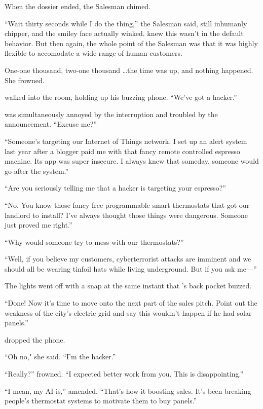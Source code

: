 When the dossier ended, the Salesman chimed.

``Wait thirty seconds while I do the thing,'' the Salesman said, still inhumanly chipper, and the smiley face actually winked. {\protag} knew this wasn't in the default behavior. But then again, the whole point of the Salesman was that it was highly flexible to accomodate a wide range of human customers.

One-one thousand, two-one thousand \dots the time was up, and nothing happened. She frowned. 

{\sidetag} walked into the room, holding up his buzzing phone. ``We've got a hacker.''

{\protag} was simultaneously annoyed by the interruption and troubled by the announcement. ``Excuse me?''

``Someone’s targeting our Internet of Things network. I set up an alert system last year after a blogger paid me with that fancy remote controlled espresso machine. Its app was super insecure. I always knew that someday, someone would go after the system.''

``Are you seriously telling me that a hacker is targeting your espresso?''

``No. You know those fancy free programmable smart thermostats that \crunchyCity{} got our landlord to install? I've always thought those things were dangerous. Someone just proved me right.''

``Why would someone try to mess with our thermostats?''

``Well, if you believe my customers, cyberterrorist attacks are imminent and we should all be wearing tinfoil hats while living underground. But if you ask me---''

The lights went off with a snap at the same instant that {\protag}'s back pocket buzzed.

``Done! Now it's time to move onto the next part of the sales pitch. Point out the weakness of the city’s electric grid and say this wouldn't happen if he had solar panels.''

{\protag} dropped the phone.

``Oh no," she said. ``I’m the hacker.''

``Really?'' {\sidetag} frowned. ``I expected better work from you. This is disappointing.''

``I mean, my AI is,'' {\protag} amended. ``That’s how it boosting sales. It's been breaking people’s thermostat systems to motivate them to buy panels.''

